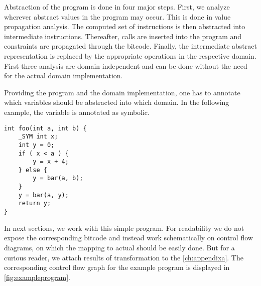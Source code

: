 Abstraction of the program is done in four major steps. First, we analyze
wherever abstract values in the program may occur. This is done in value propagation
analysis. The computed set of instructions is then abstracted into intermediate
\LART instructions. Thereafter,  calls are inserted into the
program and constraints are propagated through the bitcode. Finally, the
intermediate abstract representation is replaced by the appropriate operations
in the respective domain. First three analysis are domain independent and can be
done without the need for the actual domain implementation.

Providing the program and the domain implementation, one has
to annotate which variables should be abstracted into which domain. In
the following example, the variable  is annotated as symbolic.
\begin{verbatim}
int foo(int a, int b) {
    _SYM int x;
    int y = 0;
    if ( x < a ) {
        y = x + 4;
    } else {
        y = bar(a, b);
    }
    y = bar(a, y);
    return y;
}
\end{verbatim}
In next sections, we work with this simple \Cpp{} program. For
readability we do not expose the corresponding \LLVM bitcode and instead
work schematically on control flow diagrams, on which the mapping to actual
\LLVM should be easily done. But for a curious reader, we attach results of
\LLVM transformation to the \autoref{ch:appendixa}. The corresponding control
flow graph for the example program is displayed in \autoref{fig:exampleprogram}.

